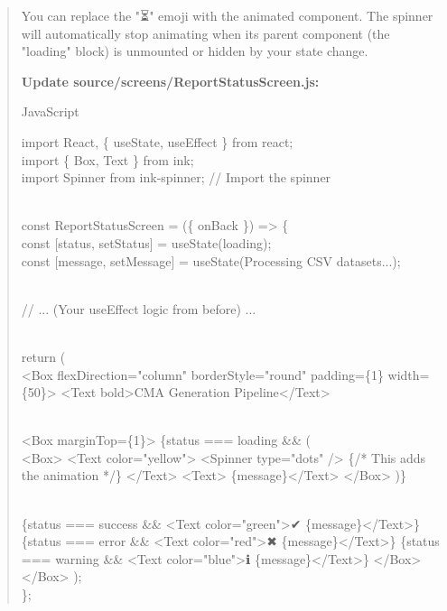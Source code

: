 \documentclass[
]{article}
\begin{document}
\begin{quote}
You can replace the "⏳" emoji with the animated component. The spinner
will automatically stop animating when its parent component (the
"loading" block) is unmounted or hidden by your state change.

\textbf{Update source/screens/ReportStatusScreen.js:}

JavaScript

import React, \{ useState, useEffect \} from
\textquotesingle react\textquotesingle;\\
import \{ Box, Text \} from \textquotesingle ink\textquotesingle;\\
import Spinner from \textquotesingle ink-spinner\textquotesingle; //
Import the spinner\\
\strut \\
const ReportStatusScreen = (\{ onBack \}) =\textgreater{} \{\\
const {[}status, setStatus{]} =
useState(\textquotesingle loading\textquotesingle);\\
const {[}message, setMessage{]} = useState(\textquotesingle Processing
CSV datasets...\textquotesingle);\\
\strut \\
// ... (Your useEffect logic from before) ...\\
\strut \\
return (\\
\textless Box flexDirection="column" borderStyle="round" padding=\{1\}
width=\{50\}\textgreater{}
\textless Text bold\textgreater CMA Generation
Pipeline\textless/Text\textgreater{}
\strut \\
\textless Box marginTop=\{1\}\textgreater{}
\{status === \textquotesingle loading\textquotesingle{} \&\& (\\
\textless Box\textgreater{}
\textless Text color="yellow"\textgreater{}
\textless Spinner type="dots" /\textgreater{} \{/* This adds the
animation */\}
\textless/Text\textgreater{}
\textless Text\textgreater{} \{message\}\textless/Text\textgreater{}
\textless/Box\textgreater{}
)\}
\strut \\
\{status === \textquotesingle success\textquotesingle{} \&\&
\textless Text color="green"\textgreater✔
\{message\}\textless/Text\textgreater\}
\{status === \textquotesingle error\textquotesingle{} \&\&
\textless Text color="red"\textgreater✖
\{message\}\textless/Text\textgreater\}
\{status === \textquotesingle warning\textquotesingle{} \&\&
\textless Text color="blue"\textgreater ℹ
\{message\}\textless/Text\textgreater\}
\textless/Box\textgreater{}
\textless/Box\textgreater{}
);\\
\};
\end{quote}
\end{document}
